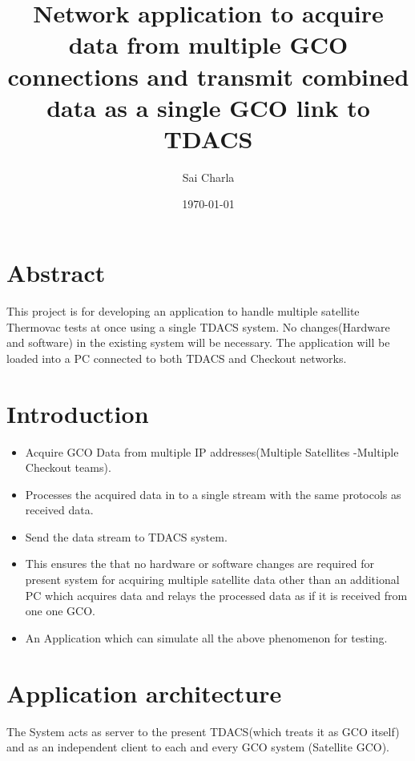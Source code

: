 \documentclass[12pt, a4paper]{report}
\title{Network application to acquire data from multiple GCO connections and
	   transmit combined data as a single GCO link to TDACS}
\author{Sai Charla}
\date{\today}
\begin{document}
\maketitle
\tableofcontents


\chapter*{Abstract}
\par This project is for developing an application to handle multiple satellite
Thermovac tests at once using a single TDACS system. No changes(Hardware and
software) in the existing system will be necessary. The application will be
loaded into a PC connected to both TDACS and Checkout networks.


\chapter{Introduction}
	\begin{itemize}
			\item Acquire GCO Data from multiple IP addresses(Multiple Satellites
					-Multiple Checkout teams).
			\item Processes the acquired data in to a single stream with the same
					protocols as received data.
			\item Send the data stream to TDACS system.
			\item This ensures the that no hardware or software changes are required
					for present system for acquiring multiple satellite data other than an
					additional PC which acquires data and relays the processed data as if it
					is received from one one GCO.
			\item An Application which can simulate all the above phenomenon for
					testing.
	\end{itemize}


\chapter{Application architecture}
The System acts as server to the present TDACS(which treats it as GCO itself)
and as an independent client to each and every GCO system (Satellite GCO).
\end{document}
